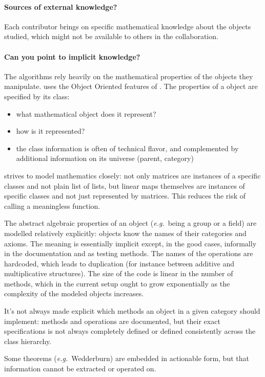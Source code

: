 \paragraph{Sources of external knowledge?}
Each \SageMath contributor brings on specific mathematical knowledge about the objects studied, which might not be available to others in the collaboration.

\paragraph{Can you point to implicit knowledge?}
The algorithms rely heavily on the mathematical properties of the objects they manipulate.
\SageMath uses the Object Oriented features of \python.
The properties of a \SageMath object are specified by its \python class:
\begin{itemize}
\item what mathematical object does it represent?
\item how is it represented?
\item the class information is often of technical flavor, and complemented
  by additional information on its universe (parent, category)
\end{itemize}

\SageMath strives to model mathematics closely: not only matrices are instances of a specific classes and not plain list of lists,  but linear maps themselves are instances of specific classes and not just represented by matrices. This reduces the  risk of calling a meaningless function.

The abstract algebraic properties of an object (\emph{e.g.}~being a group or a field) are modelled relatively explicitly: objects know the names of their categories and axioms.  The meaning is essentially implicit except, in the good cases, informally in the documentation and as testing methods. The names of the operations are hardcoded, which leads to duplication (for instance between additive and multiplicative structures). The size of the code is linear in the number of methods, which in the current setup ought to grow exponentially as the complexity of the modeled objects increases.

It's not always made explicit which methods an object in a given category should implement: methods and operations are documented, but their exact specifications is not always completely defined or defined consistently across the class hierarchy.

Some theorems (\emph{e.g.}~Wedderburn) are embedded in actionable form,  but that information cannot be extracted or operated on.

